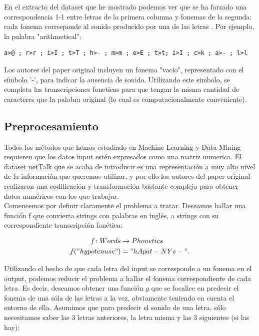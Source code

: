 \documentclass[paper=a4, fontsize=11pt]{scrartcl} %
\numberwithin{equation}{section} %
\numberwithin{figure}{section} %
\numberwithin{table}{section} %
\begin{document}
En el extracto del dataset que he mostrado podemos ver que se ha forzado una correspondencia 1-1 entre letras de la primera columna y fonemas de la segunda: cada fonema corresponde al sonido producido por una de las letras . Por ejemplo, la palabra "arithmetical": 

\begin{center}

\begin{BVerbatim}
a>@ ; r>r ; i>I ; t>T ; h>- ; m>m ; e>E ; t>t; i>I ; c>k ; a>- ; l>l               
\end{BVerbatim}

\end{center}

Los autores del paper original incluyen un fonema "vacío", representado con el símbolo '-', para indicar la ausencia de sonido. Utilizando este simbolo, se completa las transcripciones foneticas para que tengan la misma cantidad de caracteres que la palabra original (lo cual es computacionalmente conveniente).



\subsection{Preprocesamiento}

Todos los métodos que hemos estudiado en Machine Learning y Data Mining requieren que los datos input estén expresados como una matriz numerica. El dataset netTalk que se acaba de introducir es una representación a muy alto nivel de la información que queremos utilizar, y por ello los autores del paper original realizaron una codificación y transformación bastante compleja para obtener datos numéricos con los que trabajar. \\

Comencemos por definir claramente el problema a tratar. Deseamos hallar una función f que convierta strings con palabras en inglés, a strings con su correspondiente transcripción fonética:

\begin{align*}
  f \colon Words &\to Phonetics \\
  f("hypotenuse") &= "hApat-NYs-".
\end{align*}

Utilizando el hecho de que cada letra del input se corresponde a un fonema en el output, podemos reducir el problema a hallar el fonema correspondiente de cada letra. Es decir, deseamos obtener una función $g$ que se focalice en predecir el fonema de una sóla de las letras a la vez, obviamente teniendo en cuenta el entorno de ella. Asumimos que para predecir el sonido de una letra, sólo necesitamos saber las 3 letras anteriores, la letra misma y las 3 siguientes (si las hay):
\end{document}
